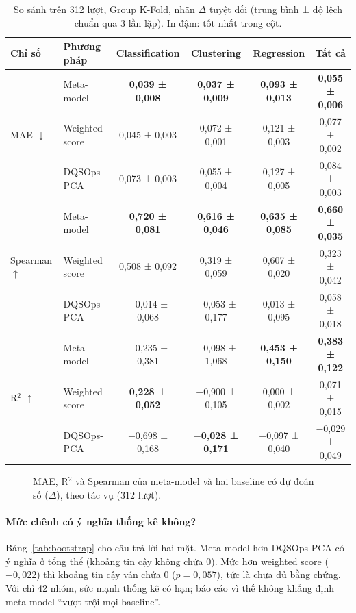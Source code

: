 \begin{table}[ht]
\centering
\small
\begin{tabular}{@{}llcccc@{}}
\toprule
Chỉ số & Phương pháp & Classification & Clustering & Regression & Tất cả \\
\midrule
\multirow{3}{*}{MAE $\downarrow$}
 & Meta-model     & \textbf{0,039 ± 0,008} & \textbf{0,037 ± 0,009} & \textbf{0,093 ± 0,013} & \textbf{0,055 ± 0,006} \\
 & Weighted score & 0,045 ± 0,003 & 0,072 ± 0,001 & 0,121 ± 0,003 & 0,077 ± 0,002 \\
 & DQSOps-PCA     & 0,073 ± 0,003 & 0,055 ± 0,004 & 0,127 ± 0,005 & 0,084 ± 0,003 \\
\midrule
\multirow{3}{*}{Spearman $\uparrow$}
 & Meta-model     & \textbf{0,720 ± 0,081} & \textbf{0,616 ± 0,046} & \textbf{0,635 ± 0,085} & \textbf{0,660 ± 0,035} \\
 & Weighted score & 0,508 ± 0,092 & 0,319 ± 0,059 & 0,607 ± 0,020 & 0,323 ± 0,042 \\
 & DQSOps-PCA     & $-$0,014 ± 0,068 & $-$0,053 ± 0,177 & 0,013 ± 0,095 & 0,058 ± 0,018 \\
\midrule
\multirow{3}{*}{R$^2$ $\uparrow$}
 & Meta-model     & $-$0,235 ± 0,381 & $-$0,098 ± 1,068 & \textbf{0,453 ± 0,150} & \textbf{0,383 ± 0,122} \\
 & Weighted score & \textbf{0,228 ± 0,052} & $-$0,900 ± 0,105 & 0,000 ± 0,002 & 0,071 ± 0,015 \\
 & DQSOps-PCA     & $-$0,698 ± 0,168 & \textbf{$-$0,028 ± 0,171} & $-$0,097 ± 0,040 & $-$0,029 ± 0,049 \\
\bottomrule
\end{tabular}
\caption{So sánh trên 312 lượt, Group K-Fold, nhãn $\Delta$ tuyệt đối (trung bình ± độ lệch chuẩn qua 3 lần lặp). In đậm: tốt nhất trong cột.}
\label{tab:main}
\end{table}

\begin{figure}[ht]
\centering
{}
\caption{MAE, R$^2$ và Spearman của meta-model và hai baseline có dự đoán số ($\Delta$), theo tác vụ (312 lượt).}
\label{fig:h5}
\end{figure}

\paragraph{Mức chênh có ý nghĩa thống kê không?} Bảng~\ref{tab:bootstrap} cho câu trả lời hai mặt. Meta-model hơn DQSOps-PCA có ý nghĩa ở tổng thể (khoảng tin cậy không chứa 0). Mức hơn weighted score ($-0{,}022$) thì khoảng tin cậy vẫn chứa 0 ($p = 0{,}057$), tức là chưa đủ bằng chứng. Với chỉ 42 nhóm, sức mạnh thống kê có hạn; báo cáo vì thế không khẳng định meta-model ``vượt trội mọi baseline''.

